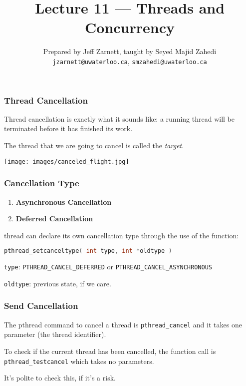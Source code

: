 

\title{Lecture 11 --- Threads and Concurrency }

\author{Prepared by Jeff Zarnett, taught by Seyed Majid Zahedi \\ \small \texttt{jzarnett@uwaterloo.ca}, \texttt{smzahedi@uwaterloo.ca}}
\date{}




\begin{frame}
	\titlepage
\end{frame}


\begin{frame}
	\frametitle{Thread Cancellation}

	Thread cancellation is exactly what it sounds like: a running thread will be terminated before it has finished its work.

	The thread that we are going to cancel is called the \textit{target}.

	\begin{center}
		\texttt{[image: images/canceled\_flight.jpg]}
	\end{center}

\end{frame}


\begin{frame}[fragile]
	\frametitle{Cancellation Type}

	\begin{enumerate}
		\item \textbf{Asynchronous Cancellation}
		\item \textbf{Deferred Cancellation}
	\end{enumerate}

	thread can declare its own cancellation type through the use of the function:
	\begin{lstlisting}[language=C]
pthread_setcanceltype( int type, int *oldtype )
\end{lstlisting}

	\texttt{type}: \texttt{PTHREAD\_CANCEL\_DEFERRED} or \texttt{PTHREAD\_CANCEL\_ASYNCHRONOUS}

	\texttt{oldtype}: previous state, if we care.

\end{frame}

\begin{frame}
	\frametitle{Send Cancellation}

	The pthread command to cancel a thread is \texttt{pthread\_cancel} and it takes one parameter (the thread identifier).

	To check if the current thread has been cancelled, the function call is \texttt{pthread\_testcancel} which takes no parameters.

	It's polite to check this, if it's a risk.

\end{frame}


